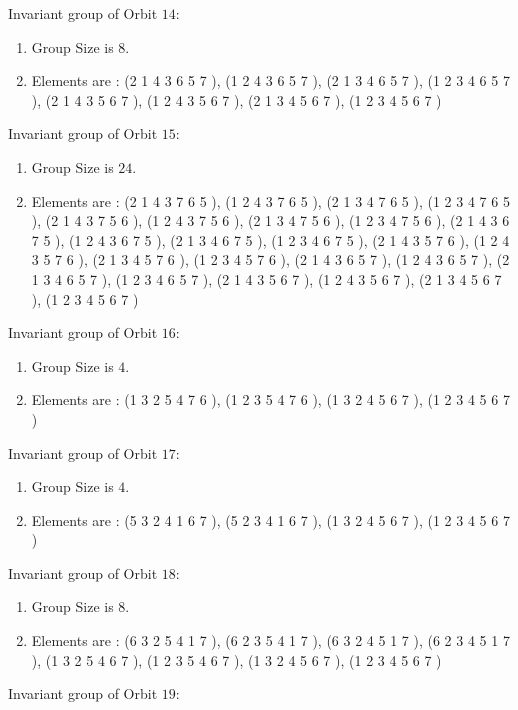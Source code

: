 \documentclass[12pt]{article}
\begin{document}
Invariant group of Orbit $14$:
\begin{enumerate}
\item Group Size is $8$.
\item Elements are : (2 1 4 3 6 5 7  ), (1 2 4 3 6 5 7  ), (2 1 3 4 6 5 7  ), (1 2 3 4 6 5 7  ), (2 1 4 3 5 6 7  ), (1 2 4 3 5 6 7  ), (2 1 3 4 5 6 7  ), (1 2 3 4 5 6 7  )
\end{enumerate}
Invariant group of Orbit $15$:
\begin{enumerate}
\item Group Size is $24$.
\item Elements are : (2 1 4 3 7 6 5  ), (1 2 4 3 7 6 5  ), (2 1 3 4 7 6 5  ), (1 2 3 4 7 6 5  ), (2 1 4 3 7 5 6  ), (1 2 4 3 7 5 6  ), (2 1 3 4 7 5 6  ), (1 2 3 4 7 5 6  ), (2 1 4 3 6 7 5  ), (1 2 4 3 6 7 5  ), (2 1 3 4 6 7 5  ), (1 2 3 4 6 7 5  ), (2 1 4 3 5 7 6  ), (1 2 4 3 5 7 6  ), (2 1 3 4 5 7 6  ), (1 2 3 4 5 7 6  ), (2 1 4 3 6 5 7  ), (1 2 4 3 6 5 7  ), (2 1 3 4 6 5 7  ), (1 2 3 4 6 5 7  ), (2 1 4 3 5 6 7  ), (1 2 4 3 5 6 7  ), (2 1 3 4 5 6 7  ), (1 2 3 4 5 6 7  )
\end{enumerate}
Invariant group of Orbit $16$:
\begin{enumerate}
\item Group Size is $4$.
\item Elements are : (1 3 2 5 4 7 6  ), (1 2 3 5 4 7 6  ), (1 3 2 4 5 6 7  ), (1 2 3 4 5 6 7  )
\end{enumerate}
Invariant group of Orbit $17$:
\begin{enumerate}
\item Group Size is $4$.
\item Elements are : (5 3 2 4 1 6 7  ), (5 2 3 4 1 6 7  ), (1 3 2 4 5 6 7  ), (1 2 3 4 5 6 7  )
\end{enumerate}
Invariant group of Orbit $18$:
\begin{enumerate}
\item Group Size is $8$.
\item Elements are : (6 3 2 5 4 1 7  ), (6 2 3 5 4 1 7  ), (6 3 2 4 5 1 7  ), (6 2 3 4 5 1 7  ), (1 3 2 5 4 6 7  ), (1 2 3 5 4 6 7  ), (1 3 2 4 5 6 7  ), (1 2 3 4 5 6 7  )
\end{enumerate}
Invariant group of Orbit $19$:
\end{document}
